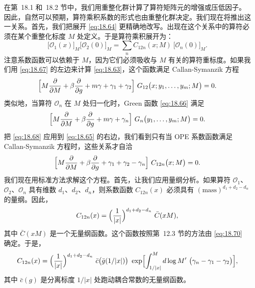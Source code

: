 在第~18.1 和~18.2 节中，我们用重整化群计算了算符矩阵元的增强或压低因子。因此，自然可以预期，算符乘积系数的形式也由重整化群决定。我们现在将推出这一关系。首先，我们把展开 \eqref{eq:18.64} 更精确地改写。出现在这个关系中的算符必须在某个重整化标度 $M$ 处定义。于是算符乘积展开为：
\begin{equation}
  \bigl[ \mathcal{O}_1(x) \bigr]_M \bigl[ \mathcal{O}_2(0) \bigr]_M
  = \sum_n C_{12n}(x; M)\ \bigl[ \mathcal{O}_n(0) \bigr]_M .
  \label{eq:18.67}
\end{equation}
注意系数函数可以依赖于 $M$，因为它们必须吸收与 $M$ 有关的算符重标度。如果我们用 \eqref{eq:18.67} 的左边来计算 \eqref{eq:18.63}，这个函数满足 Callan-Symanzik 方程
\begin{equation}
  \Bigl[ M\frac{\partial}{\partial M} + \beta\frac{\partial}{\partial g}
    + m\gamma + \gamma_1 + \gamma_2 \Bigr]\ G_{12}\bigl( x; y_1, \ldots,
      y_m; M \bigr) = 0 .
  \label{eq:18.68}
\end{equation}
类似地，当算符 $\mathcal{O}_n$ 在 $M$ 处归一化时，Green 函数 \eqref{eq:18.66} 满足
\begin{equation}
  \Bigl[ M\frac{\partial}{\partial M} + \beta\frac{\partial}{\partial g}
    + m\gamma + \gamma_n \Bigr]\ G_n\bigl( y_1, \ldots, y_m; M \bigr) = 0 .
  \label{eq:18.69}
\end{equation}
把 \eqref{eq:18.68} 应用到 \eqref{eq:18.65} 的右边，我们看到只有当 OPE 系数函数满足 Callan-Symanzik 方程时，这些关系才自洽
\begin{equation}
  \Bigl[ M\frac{\partial}{\partial M} + \beta\frac{\partial}{\partial g}
    + \gamma_1 + \gamma_2 - \gamma_n \Bigr]\ C_{12n}\bigl( x; M \bigr) = 0 .
  \label{eq:18.70}
\end{equation}
我们现在用标准方法求解这个方程。首先，让我们应用量纲分析。如果算符 $\mathcal{O}_1$、$\mathcal{O}_2$、$\mathcal{O}_n$ 具有维数 $d_1$、$d_2$、$d_n$，则系数函数 $C_{12n}(x)$ 必须具有 $(\mathrm{mass})^{d_1+d_2-d_n}$ 的量纲。因此，
\begin{equation}
  C_{12n}(x) = \Bigl( \frac{1}{|x|} \Bigr)^{d_1+d_2-d_n}\
    \bar{C}(xM) ,
  \label{eq:18.71}
\end{equation}
其中 $\bar{C}(xM)$ 是一个无量纲函数。这个函数按照第~12.3 节的方法由 \eqref{eq:18.70} 确定。于是，
\begin{equation}
  C_{12n}(x) = \Bigl( \frac{1}{|x|} \Bigr)^{d_1+d_2-d_n}\ \bar{c}\bigl(
    \bar{g}(1/|x|) \bigr)\ \exp\Bigl[ \int_{1/|x|}^{M} d\log M'\ \bigl(
      \gamma_n - \gamma_1 - \gamma_2 \bigr) \Bigr] ,
  \label{eq:18.72}
\end{equation}
其中 $\bar{c}(g)$ 是分离标度 $1/|x|$ 处跑动耦合常数的无量纲函数。

